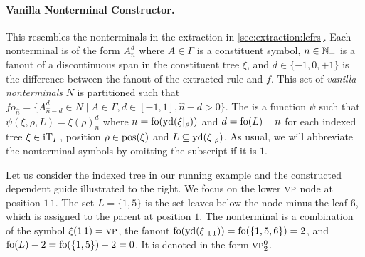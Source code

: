 \documentclass[../../document.tex]{subfiles}
\begin{document}
    \paragraph{Vanilla Nonterminal Constructor.}
    This resembles the nonterminals in the extraction in \cref{sec:extraction:lcfrs}.
    Each nonterminal is of the form \(A_{n}^{d}\) where \(A \in \varGamma\) is a constituent symbol, \(n \in \mathbb{N}_+\) is a fanout of a discontinuous span in the constituent tree \(\xi\), and \(d \in \{-1,0,+1\}\) is the difference between the fanout of the extracted rule and \(f\).
    This set of \emph{vanilla nonterminals} \(N\) is partitioned such that \(\mathit{fo}_{\hat{n}} = \{ A^d_{\hat{n}-d} \in N \mid A \in \varGamma, d \in [-1,1], \hat{n}-d > 0 \}\).
    The  is a function \(\psi\) such that \(\psi(\xi, \rho, L) = \xi(\rho)_{n}^{d}\) where \(n = \operatorname{fo}(\operatorname{yd}(\xi|_\rho))\) and \(d = \operatorname{fo}(L) - n\) for each indexed tree \(\xi \in \operatorname{iT}_\varGamma\), position \(\rho \in \operatorname{pos}(\xi)\) and \(L \subseteq \operatorname{yd}(\xi|_\rho)\).
    As usual, we will abbreviate the nonterminal symbols by omitting the subscript if it is \(1\).

    \begin{wrapfigure}[6]{r}{0pt}
        
    \end{wrapfigure}
    Let us consider the indexed tree in our running example and the constructed dependent guide illustrated to the right.
    We focus on the lower \(\textsc{vp}\) node at position \(1\,1\).
    The set \(L= \{1,5\}\) is the set leaves below the node minus the leaf \(6\), which is assigned to the parent at position \(1\).
    The nonterminal is a combination of the symbol \(\xi(1\,1) = \textsc{vp}\), the fanout \(\operatorname{fo}(\operatorname{yd}(\xi|_{1\,1})) = \operatorname{fo}(\{1,5,6\}) = 2\), and \(\operatorname{fo}(L) - 2 = \operatorname{fo}(\{1,5\})-2=0\).
    It is denoted in the form \(\textsc{vp}^0_2\).
    \exampleqed
\end{document}
